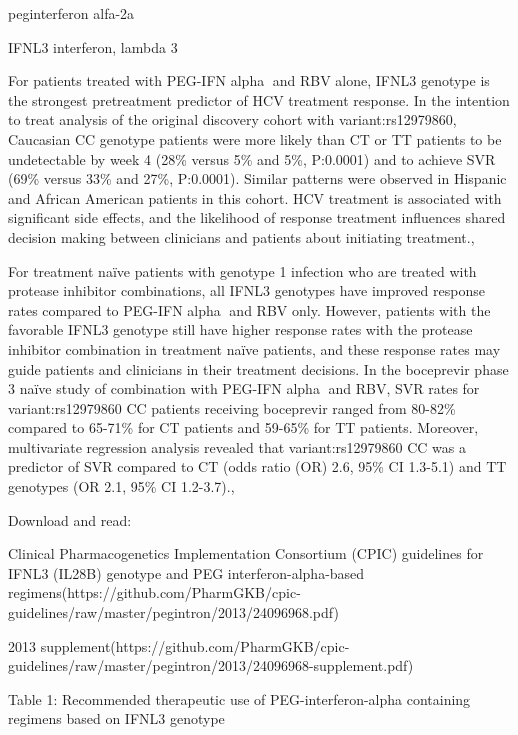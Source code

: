 \documentclass{resume} %
\begin{document}
\begin{rSection}{ peginterferon alfa-2a }
\begin{rSubsection}{ IFNL3 }{ interferon, lambda 3 }{}{}
 \newline
\item For patients treated with PEG-IFN alpha and RBV alone, IFNL3 genotype is the strongest pretreatment predictor of HCV treatment response. In the intention to treat analysis of the original discovery cohort with variant:rs12979860, Caucasian CC genotype patients were more likely than CT or TT patients to be undetectable by week 4 (28\% versus 5\% and 5\%, P:0.0001) and to achieve SVR (69\% versus 33\% and 27\%, P:0.0001). Similar patterns were observed in Hispanic and African American patients in this cohort. HCV treatment is associated with significant side effects, and the likelihood of response treatment influences shared decision making between clinicians and patients about initiating treatment.,  
 \newline
\item For treatment naïve patients with genotype 1 infection who are treated with protease inhibitor combinations, all IFNL3 genotypes have improved response rates compared to PEG-IFN alpha and RBV only. However, patients with the favorable IFNL3 genotype still have higher response rates with the protease inhibitor combination in treatment naïve patients, and these response rates may guide patients and clinicians in their treatment decisions. In the boceprevir phase 3 naïve study of combination with PEG-IFN alpha and RBV, SVR rates for variant:rs12979860 CC patients receiving boceprevir ranged from 80-82\% compared to 65-71\% for CT patients and 59-65\% for TT patients. Moreover, multivariate regression analysis revealed that variant:rs12979860 CC was a predictor of SVR compared to CT (odds ratio (OR) 2.6, 95\% CI 1.3-5.1) and TT genotypes (OR 2.1, 95\% CI 1.2-3.7)., 
 \newline
\item Download and read:
 \newline
\item Clinical Pharmacogenetics Implementation Consortium (CPIC) guidelines for IFNL3 (IL28B) genotype and PEG interferon-alpha-based regimens(https://github.com/PharmGKB/cpic-guidelines/raw/master/pegintron/2013/24096968.pdf) 
 \newline
\item 2013 supplement(https://github.com/PharmGKB/cpic-guidelines/raw/master/pegintron/2013/24096968-supplement.pdf)
 \newline
\item Table 1: Recommended therapeutic use of  PEG-interferon-alpha containing regimens based on IFNL3 genotype

\end{rSubsection}
\end{rSection}
\end{document}
